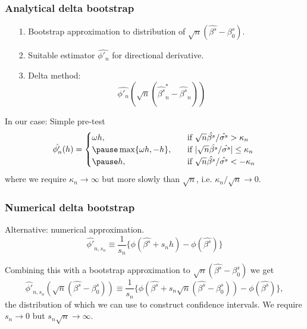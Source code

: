 \documentclass[11pt, aspectratio=169]{beamer}
\begin{document}
\begin{frame}
    \frametitle{Analytical delta bootstrap}
    \begin{itemize}
        \item[1.] Bootstrap approximation to distribution of $\sqrt{n}(\hat{\beta^s} - \beta_0^s)$.
        \item[2.] \pause Suitable estimator $\hat{\phi'_n}$ for directional derivative.
        \item[3.] \pause Delta method:
        \begin{equation*}
            \hat{\phi'_n}(\sqrt{n}(\hat{\beta^s}^*_n - \hat{\beta^s}_n))
        \end{equation*}
    \end{itemize}

    \vspace{0.5cm}
    \pause
    In our case: Simple pre-test
    \begin{equation*}
        \hat{\phi'_n}(h)=
        \begin{cases}
            \omega h ,& \quad \text{if } \sqrt{n}\hat{\beta^s}/\hat{\sigma^s} > \kappa_n\\
            \pause \max\{\omega h, -h\},& \quad \text{if } |\sqrt{n}\hat{\beta^s}/\hat{\sigma^s}| \leq \kappa_n\\
            \pause h,& \quad \text{if } \sqrt{n}\hat{\beta^s}/\hat{\sigma^s} < -\kappa_n\\
        \end{cases}
    \end{equation*}
    where we require $\kappa_n \to \infty$ but more slowly than $\sqrt{n}$, i.e. $\kappa_n / \sqrt{n} \to 0$.
\end{frame}

\begin{frame}
    \frametitle{Numerical delta bootstrap}

    Alternative: numerical approximation.
    \begin{equation*}
        \hat{\phi'}_{n, s_n} \equiv \frac{1}{s_n}\{\phi(\hat{\beta^s} + s_n h) - \phi(\hat{\beta^s})\}
    \end{equation*}

    Combining this with a bootstrap approximation to $\sqrt{n}(\hat{\beta^s} - \beta_0^s)$ we get
    \begin{equation*}
        \hat{\phi'}_{n, s_n}(\sqrt{n}(\hat{\beta^s} - \beta_0^s)) \equiv \frac{1}{s_n}\{\phi(\hat{\beta^s} + s_n \sqrt{n}(\hat{\beta^s} - \beta_0^s)) - \phi(\hat{\beta^s})\},
    \end{equation*}
    the distribution of which we can use to construct confidence intervals.
    We require $s_n\to0$ but $s_n\sqrt{n} \to \infty$.
\end{frame}
\end{document}
